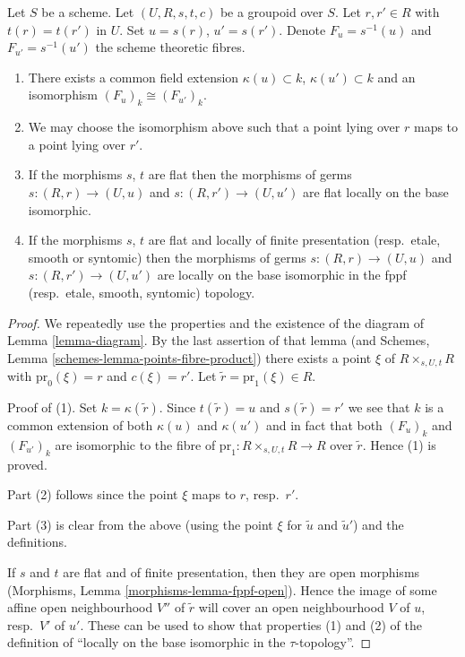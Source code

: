\begin{lemma}
\label{lemma-two-fibres}
Let $S$ be a scheme.
Let $(U, R, s, t, c)$ be a groupoid over $S$.
Let $r, r' \in R$ with $t(r) = t(r')$ in $U$.
Set $u = s(r)$, $u' = s(r')$.
Denote $F_u = s^{-1}(u)$ and $F_{u'} = s^{-1}(u')$ the scheme
theoretic fibres.
\begin{enumerate}
\item There exists a common field extension
$\kappa(u) \subset k$, $\kappa(u') \subset k$ and
an isomorphism $(F_u)_k \cong (F_{u'})_k$.
\item We may choose the isomorphism above such that a point
lying over $r$ maps to a point lying over $r'$.
\item If the morphisms $s$, $t$ are flat then the morphisms of germs
$s : (R, r) \to (U, u)$ and $s : (R, r') \to (U, u')$ are flat
locally on the base isomorphic.
\item If the morphisms $s$, $t$ are
flat and locally of finite presentation (resp.\ etale, smooth or
syntomic) then the morphisms of germs $s : (R, r) \to (U, u)$
and $s : (R, r') \to (U, u')$ are locally on the base isomorphic
in the fppf (resp.\ etale, smooth, syntomic) topology.
\end{enumerate}
\end{lemma}

\begin{proof}
We repeatedly use the properties and the existence of the diagram of
Lemma \ref{lemma-diagram}.
By the last assertion of that lemma (and
Schemes, Lemma \ref{schemes-lemma-points-fibre-product})
there exists a point $\xi$ of $R \times_{s, U, t} R$
with $\text{pr}_0(\xi) = r$ and $c(\xi) = r'$.
Let $\tilde r = \text{pr}_1(\xi) \in R$.

\medskip\noindent
Proof of (1). Set $k = \kappa(\tilde r)$. Since $t(\tilde r) = u$
and $s(\tilde r) = r'$ we see that $k$ is a common extension
of both $\kappa(u)$ and $\kappa(u')$ and in fact that
both $(F_u)_k$ and $(F_{u'})_k$ are isomorphic to the fibre of
$\text{pr}_1 : R \times_{s, U, t} R \to R$ over $\tilde r$.
Hence (1) is proved.

\medskip\noindent
Part (2) follows since the point $\xi$ maps to $r$, resp.\ $r'$.

\medskip\noindent
Part (3) is clear from the above (using the point $\xi$ for
$\tilde u$ and $\tilde u'$) and the definitions.

\medskip\noindent
If $s$ and $t$ are flat and of finite presentation, then
they are open morphisms (Morphisms, Lemma \ref{morphisms-lemma-fppf-open}).
Hence the image of some affine open neighbourhood $V''$ of $\tilde r$ will
cover an open neighbourhood $V$ of $u$, resp.\ $V'$ of $u'$.
These can be used to show that properties (1) and (2) of the
definition of ``locally on the base isomorphic in the
$\tau$-topology''.
\end{proof}

